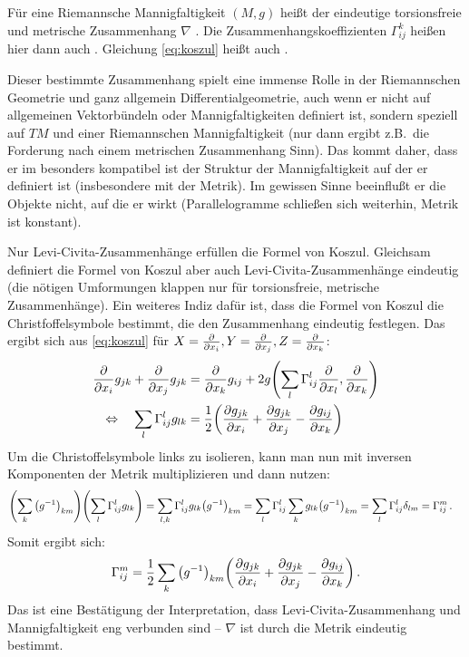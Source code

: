 \documentclass[../H_Analysis_main.tex]{subfiles}
\begin{document}
\begin{defi}
Für eine Riemannsche Mannigfaltigkeit $(M, g)$ heißt der eindeutige torsionsfreie und metrische Zusammenhang $\nabla$ . Die Zusammenhangskoeffizienten $\Gamma_{ij}^k$ heißen hier dann auch . Gleichung \eqref{eq:koszul} heißt auch .
\end{defi}
Dieser bestimmte Zusammenhang spielt eine immense Rolle in der Riemannschen Geometrie und ganz allgemein Differentialgeometrie, auch wenn er nicht auf allgemeinen Vektorbündeln oder Mannigfaltigkeiten definiert ist, sondern speziell auf $TM$ und einer Riemannschen Mannigfaltigkeit (nur dann ergibt z.B.~die Forderung nach einem metrischen Zusammenhang Sinn). Das kommt daher, dass er im besonders kompatibel ist der Struktur der Mannigfaltigkeit auf der er definiert ist (insbesondere mit der Metrik). Im gewissen Sinne beeinflußt er die Objekte nicht, auf die er wirkt (Parallelogramme schließen sich weiterhin, Metrik ist konstant).

Nur Levi-Civita-Zusammenhänge erfüllen die Formel von Koszul. Gleichsam definiert die Formel von Koszul aber auch Levi-Civita-Zusammenhänge eindeutig (die nötigen Umformungen klappen nur für torsionsfreie, metrische Zusammenhänge). Ein weiteres Indiz dafür ist, dass die Formel von Koszul die Christfoffelsymbole bestimmt, die den Zusammenhang eindeutig festlegen. Das ergibt sich aus \eqref{eq:koszul} für $X = \pdv{x_i}, Y = \pdv{x_j}, Z = \pdv{x_k}$:
\begin{align*}
\pdv{x_i} g_{jk} + \pdv{x_j} g_{jk} &= \pdv{x_k} g_{ij} + 2 g\qty(\sum_l \Gamma_{ij}^l \pdv{x_l}, \pdv{x_k})%
\\
\Leftrightarrow \quad \sum_l \Gamma_{ij}^l g_{lk} &= \frac{1}{2} \qty(\pdv{g_{jk}}{x_i} + \pdv{g_{jk}}{x_j} - \pdv{g_{ij}}{x_k})
\end{align*}
Um die Christoffelsymbole links zu isolieren, kann man nun mit inversen Komponenten der Metrik multiplizieren und dann nutzen:
\begin{align*}
\qty(\sum_k \qty(g^{-1})_{km}) \qty(\sum_l \Gamma_{ij}^l g_{lk}) = \sum_{l, k} \Gamma_{ij}^l g_{lk} \qty(g^{-1})_{km} &= \sum_l \Gamma_{ij}^l \sum_k g_{lk} \qty(g^{-1})_{km} = \sum_l \Gamma_{ij}^l \delta_{lm} = \Gamma_{ij}^m \, .
\end{align*}
Somit ergibt sich:
\begin{equation}
\Gamma_{ij}^m = \frac{1}{2} \sum_k \qty(g^{-1})_{km} \qty(\pdv{g_{jk}}{x_i} + \pdv{g_{jk}}{x_j} - \pdv{g_{ij}}{x_k}) \, .
\end{equation}
Das ist eine Bestätigung der Interpretation, dass Levi-Civita-Zusammenhang und Mannigfaltigkeit eng verbunden sind -- $\nabla$ ist durch die Metrik eindeutig bestimmt.
\end{document}
